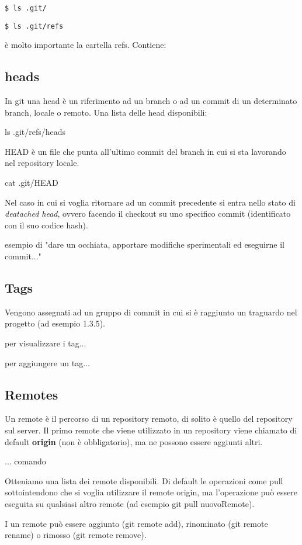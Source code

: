 \documentclass{article}
\begin{document}
\texttt{\$ ls .git/}

\texttt{\$ ls .git/refs}

è molto importante la cartella refs. Contiene:

\subsection{heads}

In git una head è un riferimento ad un branch o ad un commit di un determinato
branch, locale o remoto. Una lista delle head disponibili:

ls .git/refs/heads

HEAD è un file che punta all'ultimo commit del branch in cui si sta lavorando
nel repository locale.

cat .git/HEAD

Nel caso in cui si voglia ritornare ad un commit precedente si entra nello stato
di \emph{deatached head}, ovvero facendo il checkout su uno specifico commit
(identificato con il suo codice hash).

esempio di "dare un occhiata, apportare modifiche sperimentali ed eseguirne il
commit..."

\subsection{Tags}

Vengono assegnati ad un gruppo di commit in cui si è raggiunto un traguardo nel
progetto (ad esempio 1.3.5).

per visualizzare i tag...

per aggiungere un tag...

\subsection{Remotes}

Un remote è il percorso di un repository remoto, di solito è quello del
repository sul server. Il primo remote che viene utilizzato in un repository
viene chiamato di default \textbf{origin} (non è obbligatorio), ma ne possono
essere aggiunti altri.

... comando

Otteniamo una lista dei remote disponibili. Di default le operazioni come pull
sottointendono che si voglia utilizzare il remote origin, ma l'operazione può
essere eseguita su qualsiasi altro remote (ad esempio git pull nuovoRemote).

I un remote può essere aggiunto (git remote add), rinominato (git remote rename)
o rimosso (git remote remove).
\end{document}
